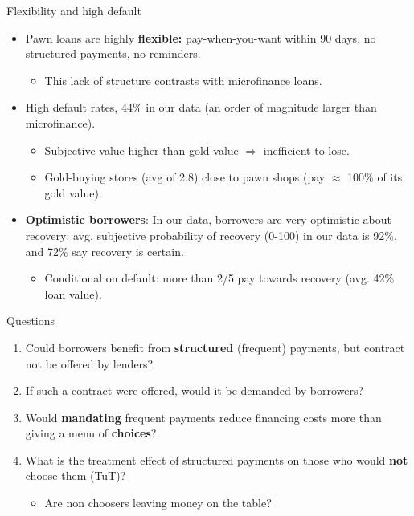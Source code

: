 \documentclass[9pt, aspectratio=169]{beamer}
\begin{document}
\begin{frame}{Flexibility and high default}
    \begin{itemize}
    \item Pawn loans are highly \textbf{flexible:} pay-when-you-want within 90 days, no structured payments, no reminders.
        \begin{itemize}
            \item This lack of structure contrasts with microfinance loans.
        \end{itemize}
    \vfill \item High default rates, 44\% in our data (an order of magnitude larger than microfinance).
    \begin{itemize}
        \item Subjective value higher than gold value $\Rightarrow$ inefficient to lose.
        \item Gold-buying stores (avg of 2.8) close to pawn shops (pay $\approx$ 100\% of its gold value).
    \end{itemize}
     \item \vfill \textbf{Optimistic borrowers}: In our data, borrowers are very optimistic about recovery: avg. subjective probability of recovery (0-100) in our data is 92\%, and 72\% say recovery is certain.
     \begin{itemize}
         \item Conditional on default: more than 2/5 pay towards recovery (avg. 42\% loan value).
     \end{itemize}
\end{itemize}
\end{frame}




\begin{frame}{Questions}
     \begin{enumerate}
         \item  Could borrowers benefit from \textbf{structured} (frequent) payments, but contract not be offered by lenders?
         \item \vfill If such a contract were offered, would it be demanded by borrowers?
        \item \vfill Would \textbf{mandating} frequent payments reduce financing costs more than giving a menu of \textbf{choices}?
        \item \vfill What is the treatment effect of structured payments on those who would \textbf{not} choose them (TuT)? 
        \begin{itemize}
            \item Are non choosers leaving money on the table?
        \end{itemize} 
     \end{enumerate}
\end{frame}
\end{document}
